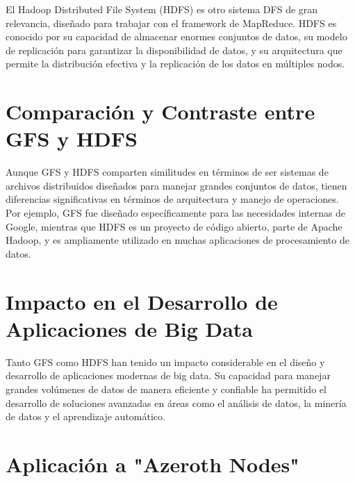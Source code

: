 El Hadoop Distributed File System (HDFS) es otro sistema DFS de gran relevancia, diseñado para trabajar con el framework de MapReduce. HDFS es conocido por su capacidad de almacenar enormes conjuntos de datos, su modelo de replicación para garantizar la disponibilidad de datos, y su arquitectura que permite la distribución efectiva y la replicación de los datos en múltiples nodos.

\section{Comparación y Contraste entre GFS y HDFS}

Aunque GFS y HDFS comparten similitudes en términos de ser sistemas de archivos distribuidos diseñados para manejar grandes conjuntos de datos, tienen diferencias significativas en términos de arquitectura y manejo de operaciones. Por ejemplo, GFS fue diseñado específicamente para las necesidades internas de Google, mientras que HDFS es un proyecto de código abierto, parte de Apache Hadoop, y es ampliamente utilizado en muchas aplicaciones de procesamiento de datos.

\section{Impacto en el Desarrollo de Aplicaciones de Big Data}

Tanto GFS como HDFS han tenido un impacto considerable en el diseño y desarrollo de aplicaciones modernas de big data. Su capacidad para manejar grandes volúmenes de datos de manera eficiente y confiable ha permitido el desarrollo de soluciones avanzadas en áreas como el análisis de datos, la minería de datos y el aprendizaje automático.

\section{Aplicación a "Azeroth Nodes"}

